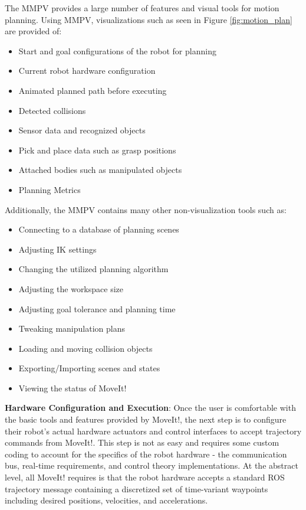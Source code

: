 \documentclass[10pt,journal,compsoc]{joser1}
\begin{document}
{The MMPV provides a large number of features and visual tools for motion planning. Using MMPV, visualizations such as seen in Figure \ref{fig:motion_plan} are provided of:

\begin{itemize}
    \item Start and goal configurations of the robot for planning
    \item Current robot hardware configuration
    \item Animated planned path before executing
    \item Detected collisions
    \item Sensor data and recognized objects
    \item Pick and place data such as grasp positions
    \item Attached bodies such as manipulated objects
    \item Planning Metrics
\end{itemize}

Additionally, the MMPV contains many other non-visualization tools such as:
\begin{itemize}
    \item Connecting to a database of planning scenes
    \item Adjusting IK settings
    \item Changing the utilized planning algorithm
    \item Adjusting the workspace size
    \item Adjusting goal tolerance and planning time
    \item Tweaking manipulation plans
    \item Loading and moving collision objects
    \item Exporting/Importing scenes and states
    \item Viewing the status of MoveIt!
\end{itemize}

{\bf Hardware Configuration and Execution}: Once the user is comfortable with the basic tools and features provided by MoveIt!, the next step is to configure their robot's actual hardware actuators and control interfaces to accept trajectory commands from MoveIt!. This step is not as easy and requires some custom coding to account for the specifics of the robot hardware - the communication bus, real-time requirements, and control theory implementations. At the abstract level, all MoveIt! requires is that the robot hardware accepts a standard ROS trajectory message containing a discretized set of time-variant waypoints including desired positions, velocities, and accelerations.  

}
\end{document}

